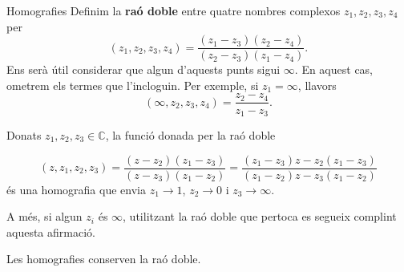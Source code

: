 \documentclass[dvipsnames, svgnames, leqno, a4paper, 12pt]{report}
\begin{document}
\begin{chapter}{Homografies}
        \noindent Definim la \textbf{raó doble} entre quatre nombres complexos $z_1,z_2,z_3,z_4$ per 
        \begin{displaymath}
                (z_1,z_2,z_3,z_4) = \frac{(z_1-z_3)(z_2-z_4)}{(z_2-z_3)(z_1-z_4)}.
        \end{displaymath}
        Ens serà útil considerar que algun d'aquests punts sigui $\infty$. En aquest cas, ometrem els termes que l'incloguin. Per exemple, si $z_1 = \infty$, llavors 
        \begin{displaymath}
                (\infty, z_2,z_3,z_4) = \frac{z_2-z_4}{z_1-z_3}.
        \end{displaymath}

        \noindent Donats $z_1,z_2,z_3\in\mathbb{C}$, la funció donada per la raó doble 
        
        \begin{equation}\label{eq:rao_doble}
            (z,z_1,z_2,z_3) = \frac{(z-z_2)(z_1-z_3)}{(z-z_3)(z_1-z_2)}=\frac{(z_1-z_3)z-z_2(z_1-z_3)}{(z_1-z_2)z-z_3(z_1-z_2)}
        \end{equation}
        és una homografia que envia $z_1\to1$, $z_2\to0$ i $z_3\to\infty$.

        A més, si algun $z_i$ és $\infty$, utilitzant la raó doble que pertoca es segueix complint aquesta afirmació.

    \begin{proposition}
        Les homografies conserven la raó doble.
    \end{proposition}


\end{chapter}
\end{document}
